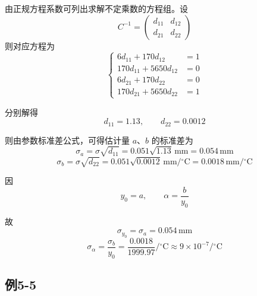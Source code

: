 \documentclass[UTF8,zihao=-4]{ctexart}
\newcommand{\problem}[1]{\subsection*{#1}}
\begin{document}
由正规方程系数可列出求解不定乘数的方程组。设
\begin{equation*}
    C^{-1}=
    \begin{pmatrix}
        d_{11} & d_{12}\\
        d_{21} & d_{22}
    \end{pmatrix}
\end{equation*}
则对应方程为
\begin{equation*}
\left\{
\begin{aligned}
    6d_{11}+170d_{12}&=1\\
    170d_{11}+5650d_{12}&=0\\
    6d_{21}+170d_{22}&=0\\
    170d_{21}+5650d_{22}&=1
\end{aligned}
\right.
\end{equation*}

分别解得
\begin{equation*}
    d_{11}=1.13,
    \qquad
    d_{22}=0.0012
\end{equation*}

则由参数标准差公式，可得估计量 $a$、$b$ 的标准差为
\begin{equation*}
    \sigma_a
    =
    \sigma\sqrt{d_{11}}
    =
    0.051\sqrt{1.13}\,\mathrm{mm}
    =
    0.054\,\mathrm{mm}
\end{equation*}
\begin{equation*}
    \sigma_b
    =
    \sigma\sqrt{d_{22}}
    =
    0.051\sqrt{0.0012}\,\mathrm{mm}/{}^\circ\mathrm{C}
    =
    0.0018\,\mathrm{mm}/{}^\circ\mathrm{C}
\end{equation*}

因
\begin{equation*}
    y_0=a,
    \qquad
    \alpha=\frac{b}{y_0}
\end{equation*}

故
\begin{equation*}
    \sigma_{y_0}
    =
    \sigma_a
    =
    0.054\,\mathrm{mm}
\end{equation*}
\begin{equation*}
    \sigma_{\alpha}
    =
    \frac{\sigma_b}{y_0}
    =
    \frac{0.0018}{1999.97}/{}^\circ\mathrm{C}
    \approx9\times10^{-7}/{}^\circ\mathrm{C}
\end{equation*}

\problem{例5-5}
\end{document}
